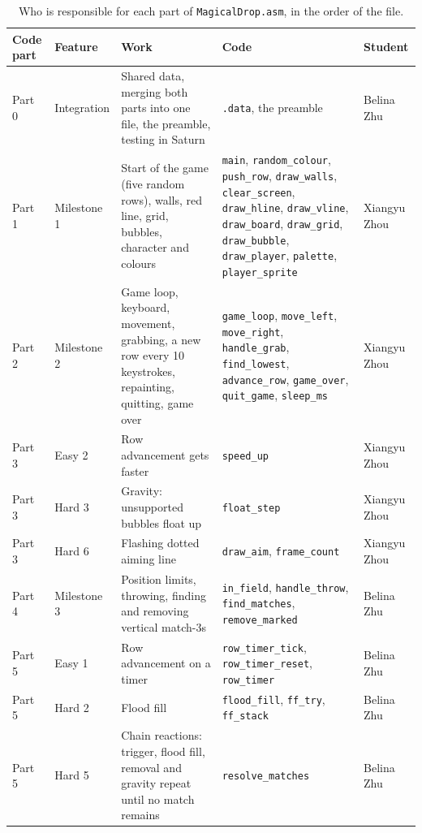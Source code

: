 \documentclass[11pt]{article}
\newcommand{\code}[1]{\texttt{#1}}
\begin{document}
\begin{table}[H]
\centering
\small
\begin{tabular}{@{}>{\raggedright\arraybackslash}p{1.1cm}>{\raggedright\arraybackslash}p{1.9cm}>{\raggedright\arraybackslash}p{3.9cm}>{\raggedright\arraybackslash}p{5.0cm}>{\raggedright\arraybackslash}p{2.3cm}@{}}
\toprule
Code part & Feature & Work & Code & Student\\
\midrule
Part 0 & Integration & Shared data, merging both parts into one file, the
preamble, testing in Saturn & \code{.data}, the preamble & Belina Zhu\\
\addlinespace
Part 1 & Milestone 1 & Start of the game (five random rows), walls, red
line, grid, bubbles, character and colours & \code{main},
\code{random\_colour}, \code{push\_row}, \code{draw\_walls},
\code{clear\_screen}, \code{draw\_hline}, \code{draw\_vline},
\code{draw\_board}, \code{draw\_grid}, \code{draw\_bubble},
\code{draw\_player}, \code{palette}, \code{player\_sprite} & Xiangyu Zhou\\
\addlinespace
Part 2 & Milestone 2 & Game loop, keyboard, movement, grabbing, a new row
every 10 keystrokes, repainting, quitting, game over & \code{game\_loop},
\code{move\_left}, \code{move\_right}, \code{handle\_grab},
\code{find\_lowest}, \code{advance\_row}, \code{game\_over},
\code{quit\_game}, \code{sleep\_ms} & Xiangyu Zhou\\
\addlinespace
Part 3 & Easy 2 & Row advancement gets faster & \code{speed\_up} & Xiangyu
Zhou\\
\addlinespace
Part 3 & Hard 3 & Gravity: unsupported bubbles float up &
\code{float\_step} & Xiangyu Zhou\\
\addlinespace
Part 3 & Hard 6 & Flashing dotted aiming line & \code{draw\_aim},
\code{frame\_count} & Xiangyu Zhou\\
\addlinespace
Part 4 & Milestone 3 & Position limits, throwing, finding and removing
vertical match-3s & \code{in\_field}, \code{handle\_throw},
\code{find\_matches}, \code{remove\_marked} & Belina Zhu\\
\addlinespace
Part 5 & Easy 1 & Row advancement on a timer & \code{row\_timer\_tick},
\code{row\_timer\_reset}, \code{row\_timer} & Belina Zhu\\
\addlinespace
Part 5 & Hard 2 & Flood fill & \code{flood\_fill}, \code{ff\_try},
\code{ff\_stack} & Belina Zhu\\
\addlinespace
Part 5 & Hard 5 & Chain reactions: trigger, flood fill, removal and gravity
repeat until no match remains & \code{resolve\_matches} & Belina Zhu\\
\bottomrule
\end{tabular}
\caption{Who is responsible for each part of \code{MagicalDrop.asm}, in the
order of the file.}
\label{tab:attribution}
\end{table}
\end{document}
